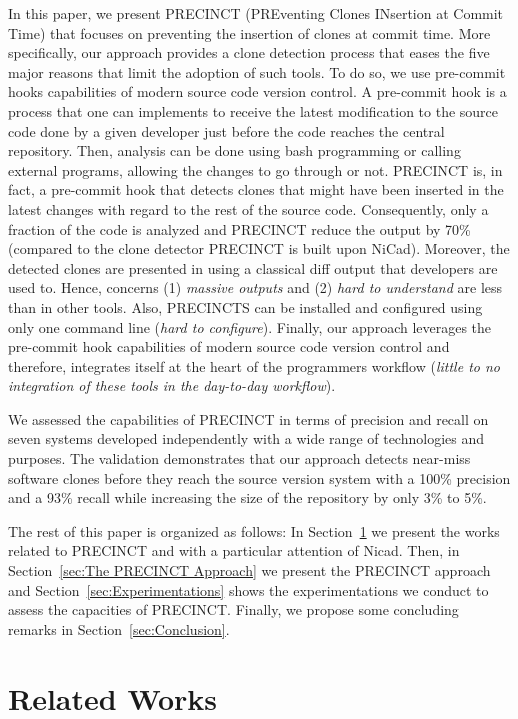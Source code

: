 \documentclass[conference]{IEEEtran}
\begin{document}
In this paper, we present PRECINCT (PREventing Clones INsertion at Commit Time) that focuses on preventing the insertion of clones at commit time.
More specifically, our approach provides a clone detection process that eases the five major reasons that limit the adoption of such tools.
To do so, we use pre-commit hooks capabilities of modern source code version control.
A pre-commit hook is a process that one can implements to receive the latest modification to the source code done by a given developer just before the code reaches the central repository.
Then, analysis can be done using bash programming or calling external programs, allowing the changes to go through or not.
PRECINCT is, in fact, a pre-commit hook that detects clones that might have been inserted in the latest changes with regard to the rest of the source code.
Consequently, only a fraction of the code is analyzed and PRECINCT reduce the output by 70\% (compared to the clone detector PRECINCT is built upon NiCad\cite{Cordy2011}).
Moreover, the detected clones are presented in using a classical diff output that developers are used to.
Hence, concerns (1) \textit{massive outputs} and (2) \textit{hard to understand} are less than in other tools.
Also, PRECINCTS can be installed and configured using only one command line (\textit{hard to configure}).
Finally, our approach leverages the pre-commit hook capabilities of modern source code version control and therefore, integrates itself at the heart of the programmers workflow (\textit{little to no integration of these tools in the day-to-day workflow}).

We assessed the capabilities of PRECINCT in terms of precision and recall on seven systems developed independently with a wide range of technologies and purposes.
The validation demonstrates that our approach detects near-miss software clones before they reach the source version system with a 100\% precision and a 93\% recall while increasing the size of the repository by only 3\% to 5\%.

The rest of this paper is organized as follows: In Section~\ref{sec:Related Works} we present the works related to PRECINCT and with a particular attention of Nicad.
Then, in Section~\ref{sec:The PRECINCT Approach} we present the PRECINCT approach and Section~\ref{sec:Experimentations} shows the experimentations we conduct to assess the capacities of PRECINCT.
Finally, we propose some concluding remarks in Section~\ref{sec:Conclusion}.

\section{Related Works}
\label{sec:Related Works}
\end{document}
